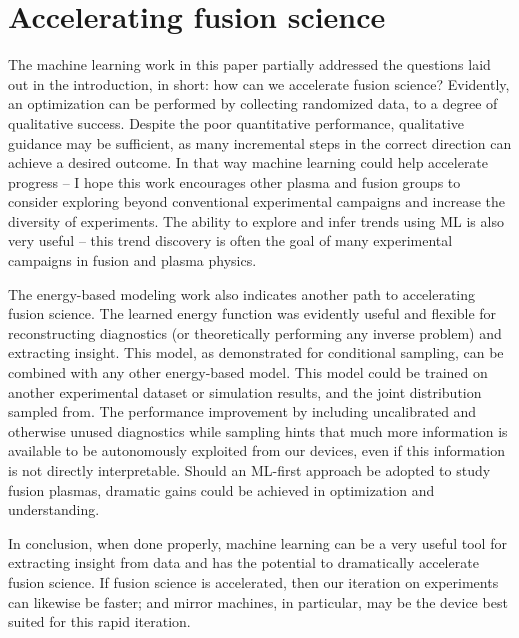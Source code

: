 \section{Accelerating fusion science}

The machine learning work in this paper partially addressed the questions laid out in the introduction, in short: how can we accelerate fusion science? Evidently, an optimization can be performed by collecting randomized data, to a degree of qualitative success. Despite the poor quantitative performance, qualitative guidance may be sufficient, as many incremental steps in the correct direction can achieve a desired outcome. In that way machine learning could help accelerate progress -- I hope this work encourages other plasma and fusion groups to consider exploring beyond conventional experimental campaigns and increase the diversity of experiments. The ability to explore and infer trends using ML is also very useful -- this trend discovery is often the goal of many experimental campaigns in fusion and plasma physics. 

The energy-based modeling work also indicates another path to accelerating fusion science. The learned energy function was evidently useful and flexible for reconstructing diagnostics (or theoretically performing any inverse problem) and extracting insight. This model, as demonstrated for conditional sampling, can be combined with any other energy-based model. This model could be trained on another experimental dataset or simulation results, and the joint distribution sampled from. The performance improvement by including uncalibrated and otherwise unused diagnostics while sampling hints that much more information is available to be autonomously exploited from our devices, even if this information is not directly interpretable. Should an ML-first approach be adopted to study fusion plasmas, dramatic gains could be achieved in optimization and understanding. 

In conclusion, when done properly, machine learning can be a very useful tool for extracting insight from data and has the potential to dramatically accelerate fusion science. If fusion science is accelerated, then our iteration on experiments can likewise be faster; and mirror machines, in particular, may be the device best suited for this rapid iteration.



























